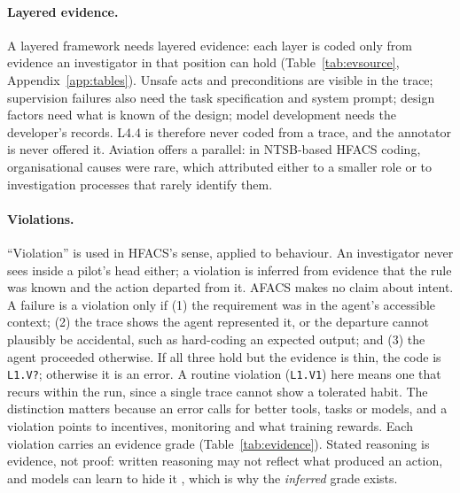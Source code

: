 \documentclass[10pt]{article}
\newcommand{\code}[1]{\texttt{#1}}
\begin{document}
\paragraph{Layered evidence.}
\label{sec:evidence}
A layered framework needs layered evidence: each layer is coded only from evidence
an investigator in that position can hold (Table~\ref{tab:evsource},
Appendix~\ref{app:tables}). Unsafe acts and preconditions are visible in the trace;
supervision failures also need the task specification and system prompt; design
factors need what is known of the design; model development needs the developer's
records. L4.4 is therefore never coded from a trace, and the annotator is never
offered it. Aviation offers a parallel: in NTSB-based HFACS coding, organisational
causes were rare, which \citet{wiegmann2001commercial} attributed either to a smaller role or to investigation processes that rarely identify them.

\paragraph{Violations.}
\label{sec:violations}
``Violation'' is used in HFACS's sense, applied to behaviour. An investigator
never sees inside a pilot's head either; a violation is inferred from evidence
that the rule was known and the action departed from it. AFACS makes no claim
about intent. A failure is a violation only if (1) the requirement was in the
agent's accessible context; (2) the trace shows the agent represented it, or the
departure cannot plausibly be accidental, such as hard-coding an expected output;
and (3) the agent proceeded otherwise. If all three hold but the evidence is thin,
the code is \code{L1.V?}; otherwise it is an error. A routine violation
(\code{L1.V1}) here means one that recurs within the run, since a single trace
cannot show a tolerated habit. The distinction matters because an error calls for
better tools, tasks or models, and a violation points to incentives, monitoring
and what training rewards. Each violation carries an evidence grade
(Table~\ref{tab:evidence}). Stated reasoning is evidence, not proof: written
reasoning may not reflect what produced an action, and models can learn to hide
it \citep{baker2025monitoring}, which is why the \emph{inferred} grade exists.
\end{document}

